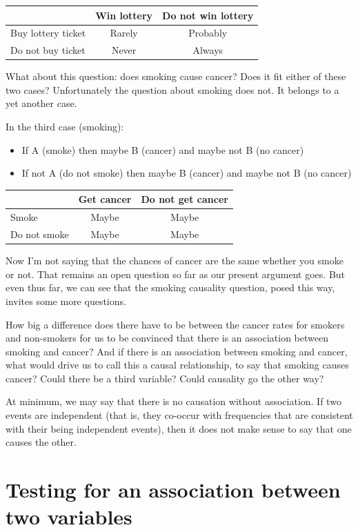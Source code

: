 \documentclass[openany]{book}
\providecommand{\tightlist}{%
  \setlength{\itemsep}{0pt}\setlength{\parskip}{0pt}}
\begin{document}
\begin{longtable}[]{@{}lcc@{}}
\toprule
& Win lottery & Do not win lottery\tabularnewline
\midrule
\endhead
Buy lottery ticket & Rarely & Probably\tabularnewline
Do not buy ticket & Never & Always\tabularnewline
\bottomrule
\end{longtable}

What about this question: does smoking cause cancer? Does it fit either of these two cases? Unfortunately the question about smoking does not. It belongs to a yet another case.

In the third case (smoking):

\begin{itemize}
\tightlist
\item
  If A (smoke) then maybe B (cancer) and maybe not B (no cancer)
\item
  If not A (do not smoke) then maybe B (cancer) and maybe not B (no cancer)
\end{itemize}

\begin{longtable}[]{@{}lcc@{}}
\toprule
& Get cancer & Do not get cancer\tabularnewline
\midrule
\endhead
Smoke & Maybe & Maybe\tabularnewline
Do not smoke & Maybe & Maybe\tabularnewline
\bottomrule
\end{longtable}

Now I'm not saying that the chances of cancer are the same whether you smoke or not. That remains an open question so far as our present argument goes. But even thus far, we can see that the smoking causality question, posed this way, invites some more questions.

How big a difference does there have to be between the cancer rates for smokers and non-smokers for us to be convinced that there is an association between smoking and cancer? And if there is an association between smoking and cancer, what would drive us to call this a causal relationship, to say that smoking causes cancer? Could there be a third variable? Could causality go the other way?

At minimum, we may say that there is no causation without association. If two events are independent (that is, they co-occur with frequencies that are consistent with their being independent events), then it does not make sense to say that one causes the other.

\hypertarget{testing-for-an-association-between-two-variables}{%
\section*{Testing for an association between two variables}\label{testing-for-an-association-between-two-variables}}
\end{document}
